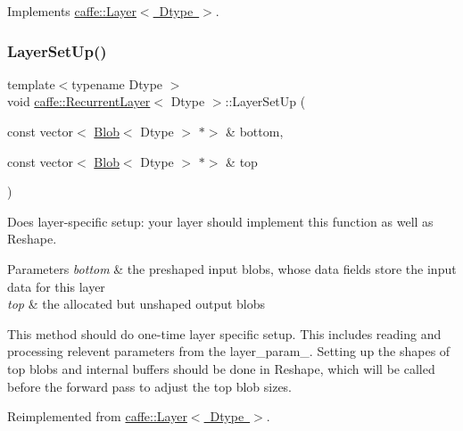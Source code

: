 Implements \mbox{\hyperlink{classcaffe_1_1_layer_a576ac6a60b1e99fe383831f52a6cea77}{caffe\+::\+Layer$<$ Dtype $>$}}.

\mbox{\label{classcaffe_1_1_recurrent_layer_a4eec13bfbe23b1e3eb2bbc4652bd6952}} 
\subsubsection{\texorpdfstring{Layer\+Set\+Up()}{LayerSetUp()}\hspace{0.1cm}{\footnotesize\ttfamily [1/2]}}
{\footnotesize\ttfamily template$<$typename Dtype $>$ \\
void \mbox{\hyperlink{classcaffe_1_1_recurrent_layer}{caffe\+::\+Recurrent\+Layer}}$<$ Dtype $>$\+::Layer\+Set\+Up (\begin{DoxyParamCaption}\item[{const vector$<$ \mbox{\hyperlink{classcaffe_1_1_blob}{Blob}}$<$ Dtype $>$ $\ast$$>$ \&}]{bottom,  }\item[{const vector$<$ \mbox{\hyperlink{classcaffe_1_1_blob}{Blob}}$<$ Dtype $>$ $\ast$$>$ \&}]{top }\end{DoxyParamCaption})\hspace{0.3cm}{\ttfamily [virtual]}}



Does layer-\/specific setup\+: your layer should implement this function as well as Reshape. 


\begin{DoxyParams}{Parameters}
{\em bottom} & the preshaped input blobs, whose data fields store the input data for this layer \\
\hline
{\em top} & the allocated but unshaped output blobs\\
\hline
\end{DoxyParams}
This method should do one-\/time layer specific setup. This includes reading and processing relevent parameters from the {\ttfamily layer\+\_\+param\+\_\+}. Setting up the shapes of top blobs and internal buffers should be done in {\ttfamily Reshape}, which will be called before the forward pass to adjust the top blob sizes. 

Reimplemented from \mbox{\hyperlink{classcaffe_1_1_layer_a481323a3e0972c682787f2137468c29f}{caffe\+::\+Layer$<$ Dtype $>$}}.

